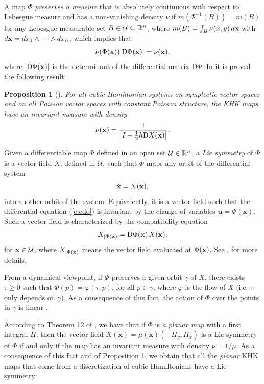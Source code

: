\documentclass[11pt]{article}
\newtheorem {proposition} [theorem]{Proposition}
\newcommand{\R}{{\mathbb R}}
\newcommand{\U}{{\cal{U}}}
\begin{document}
A map $\Phi$ \emph{preserves a measure} that is absolutely continuous with respect to Lebesgue measure and has a non-vanishing density $\nu$ if $m(\Phi^{-1}(B)) = m(B)$ for any Lebesgue measurable set $B\in \U\subseteq \R^n$, where $ m(B)=\int_{B} \nu(x,y)\,d{\bf{x}}$ with $d{\bf{x}}=dx_1\wedge\cdots\wedge dx_n$, which implies that
\begin{equation}	\label{e:mesura}
\nu(\Phi({\bf{x}}))|{\mathrm D}\Phi({\bf{x}})|=\nu({\bf{x}}),
\end{equation}
where $|{\mathrm D}\Phi({\bf{x}})|$ is the determinant of the differential matrix ${\mathrm D}\Phi$.
In \cite{Celledoni2013} it is proved the following result:


\begin{proposition}[\cite{Celledoni2013}]\label{p:measure}
For all cubic Hamiltonian systems on symplectic vector spaces and on all Poisson vector spaces with constant Poisson structure,
the KHK maps have an invariant measure with density
$$
 \nu({\bf{x}})=\frac{1}{\left|I-\frac{1}{2}h {\mathrm D}X({\bf{x}})\right|}.
$$
\end{proposition}

Given a differentiable map $\Phi$
defined in an open set $\U\in\R^n$, a \emph{Lie symmetry} of $\Phi$ is a vector field $X$, defined in
$\U,$ such that $\Phi$ maps any orbit of the differential system
\begin{equation}\label{e:edo}
\dot{\bf{x}}=X({\bf{x}}),
\end{equation}
 into another orbit of the system. Equivalently, it is a {vector field}
such that the differential equation (\ref{e:edo}) is invariant by the change of variables $\mathbf{u}=\Phi(\mathbf{x})$. Such a vector field is characterized by the compatibility
equation
\begin{equation}\label{e:Lie-sym-char}
X_{|\Phi({\bf{x}})}={\mathrm D}\Phi({\bf{x}})\,X({\bf{x}}),
\end{equation} for $\bf{x}\in \U$,
where
$X_{|\Phi({\bf{x}})}$ means the vector field evaluated at $\Phi({\bf{x}})$. See  \cite{haggar}, for more details.

From a dynamical viewpoint, if $\Phi$ preserves a given  orbit $\gamma$ of $X$, there exists $\tau\geq 0$ such that $\Phi(p)=\varphi(\tau,p)$, for all
$p\in \gamma$, where $\varphi$  is the flow of $X$ (i.e. $\tau$ only depends on $\gamma$).  As a consequence of this fact, the action of $\Phi$ over the points in $\gamma$ is linear \cite[Theorem 1]{CGM08}.

According to Theorem 12 of \cite{CGM08}, we have that if $\Phi$ is \emph{a planar map} with a first integral $H$, then the vector field
$X(\mathbf{x})=\mu(\mathbf{x})\left(-H_y,H_x\right)$ is a Lie symmetry of $\Phi$ if and only if the map has an invariant measure with density $\nu=1/\mu$. As a consequence of this fact and of  Proposition \ref{p:measure}, we obtain that all the \emph{planar}  KHK maps that come from a discretization of cubic Hamiltonians have a Lie symmetry:
\end{document}
